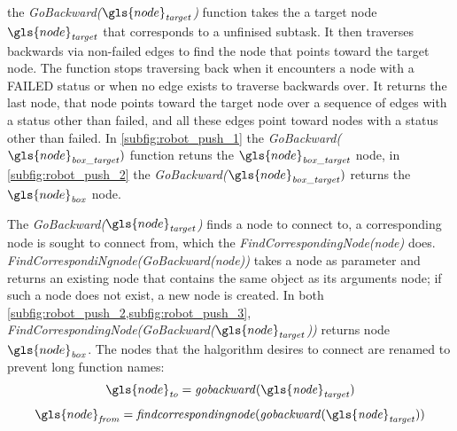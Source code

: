  the \textit{GoBackward($\gls{node}_\mathit{target}$)} function takes the a target node $\gls{node}_\mathit{target}$ that corresponds to a unfinised subtask. It then traverses backwards via non-failed edges to find the node that points toward the target node. The function stops traversing back when it encounters a node with a FAILED status or when no edge exists to traverse backwards over. It returns the last node, that node points toward the target node over a sequence of edges with a status other than failed, and all these edges point toward nodes with a status other than failed. In \cref{subfig:robot_push_1} the \textit{GoBackward($\gls{node}_\mathit{box\_target})$} function retuns the $\gls{node}_\mathit{box\_target}$ node, in \cref{subfig:robot_push_2} the \textit{GoBackward($\gls{node}_\mathit{box\_target})$} returns the $\gls{node}_\mathit{box}$ node.\bs

The \textit{GoBackward($\gls{node}_\mathit{target}$)} finds a node to connect to, a corresponding node is sought to connect from, which the \textit{FindCorrespondingNode(\gls{node})} does. \textit{FindCorrespondiNgnode(GoBackward(\gls{node}))} takes a node as parameter and returns an existing node that contains the same object as its arguments node; if such a node does not exist, a new node is created. In both \cref{subfig:robot_push_2,subfig:robot_push_3}, \textit{FindCorrespondingNode(GoBackward($\gls{node}_\mathit{target}$))} returns node $\gls{node}_\mathit{box}$. The nodes that the \ac{halgorithm} desires to connect are renamed to prevent long function names: 
\[\gls{node}_\mathit{to} =  \mathit{gobackward(\gls{node}_\mathit{target})}\]
\[\gls{node}_\mathit{from} = \mathit{findcorrespondingnode(gobackward(\gls{node}_\mathit{target}))}\]

